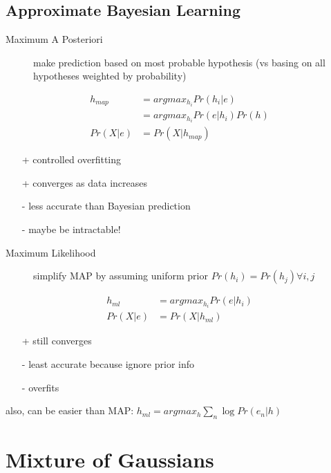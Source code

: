 \documentclass[]{article}
\theoremstyle{definition}
\begin{document}
    \subsection{Approximate Bayesian Learning}
    \label{sub:approximate_bayesian_learning}
    
    \begin{description}
        \item[Maximum A Posteriori] make prediction based on most probable hypothesis (vs basing on all hypotheses weighted by probability)
    \end{description}
    \begin{align*}
        h_{map} &= argmax_{h_i} Pr(h_i | e) \\
                &= argmax_{h_i} Pr(e | h_i) Pr(h) \\
        Pr(X | e) &= Pr(X | h_{map})
    \end{align*}
    \begin{itemize}
        \item[+] controlled overfitting
        \item[+] converges as data increases
        \item[-] less accurate than Bayesian prediction
        \item[-] maybe be intractable!
    \end{itemize}

    \begin{description}
        \item[Maximum Likelihood] simplify MAP by assuming uniform prior $Pr(h_i) = Pr(h_j) \forall i,j$
    \end{description}
    \begin{align*}
        h_{ml} &= argmax_{h_i} Pr(e | h_i) \\
        Pr(X | e) &= Pr(X | h_{ml})
    \end{align*}
    \begin{itemize}
        \item[+] still converges
        \item[-] least accurate because ignore prior info
        \item[-] overfits
    \end{itemize}
    also, can be easier than MAP: $h_{ml} = argmax_h \sum_n \log Pr(e_n|h)$
    

    \section{Mixture of Gaussians}
    \label{sec:mixture_of_gaussians}
\end{document}
